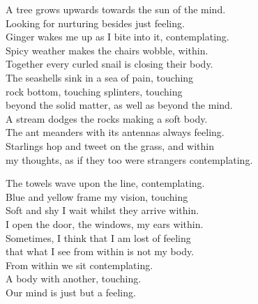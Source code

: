 A tree grows upwards towards the sun of the mind.\\
Looking for nurturing besides just feeling. \\
Ginger wakes me up as I bite into it, contemplating.\\
Spicy weather makes the chairs wobble, within.\\
Together every curled snail is closing their body.\\
The seashells sink in a sea of pain, touching\\[10pt plus 2pt]

rock bottom, touching splinters, touching\\
beyond the solid matter, as well as beyond the mind.\\
A stream dodges the rocks making a soft body.\\
The ant meanders with its antennas always feeling.\\
Starlings hop and tweet on the grass, and within\\
my thoughts, as if they too were strangers contemplating.\\[10pt plus 2pt]

\break

The towels wave upon the line, contemplating.\\
Blue and yellow frame my vision, touching\\
Soft and shy I wait whilst they arrive within.\\
I open the door, the windows, my ears within.\\
Sometimes, I think that I am lost of feeling\\
that what I see from within is not my body.\\[14pt plus 2pt]

From within we sit contemplating.\\
A body with another, touching.\\
Our mind is just but a feeling.\\[10pt plus 2pt]

\egroup
